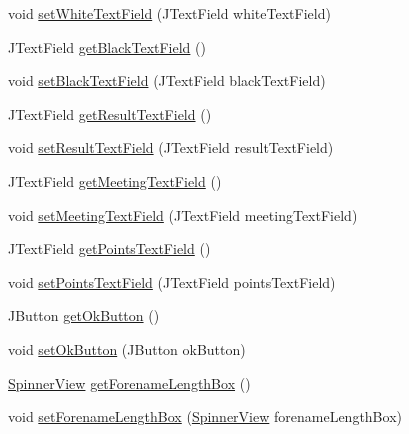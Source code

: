 \begin{DoxyCompactItemize}
\item 
void \hyperlink{classde_1_1turnierverwaltung_1_1view_1_1_settings_view_afed5802f8efe36f394f4f3c52293af0a}{set\+White\+Text\+Field} (J\+Text\+Field white\+Text\+Field)
\item 
J\+Text\+Field \hyperlink{classde_1_1turnierverwaltung_1_1view_1_1_settings_view_aff2ad10392883ad57f2d52b2e9c9bcf4}{get\+Black\+Text\+Field} ()
\item 
void \hyperlink{classde_1_1turnierverwaltung_1_1view_1_1_settings_view_ac0c84d91993e8a69f2d881677b52ac92}{set\+Black\+Text\+Field} (J\+Text\+Field black\+Text\+Field)
\item 
J\+Text\+Field \hyperlink{classde_1_1turnierverwaltung_1_1view_1_1_settings_view_a7e8f7264776e0f74a62793919a513cfe}{get\+Result\+Text\+Field} ()
\item 
void \hyperlink{classde_1_1turnierverwaltung_1_1view_1_1_settings_view_abf9376b0c56ca9e6a0b1d2142349c66c}{set\+Result\+Text\+Field} (J\+Text\+Field result\+Text\+Field)
\item 
J\+Text\+Field \hyperlink{classde_1_1turnierverwaltung_1_1view_1_1_settings_view_a02e52b023a745f1feea93f39beca2133}{get\+Meeting\+Text\+Field} ()
\item 
void \hyperlink{classde_1_1turnierverwaltung_1_1view_1_1_settings_view_aa22e7e8cab7b73fbb075499e66836343}{set\+Meeting\+Text\+Field} (J\+Text\+Field meeting\+Text\+Field)
\item 
J\+Text\+Field \hyperlink{classde_1_1turnierverwaltung_1_1view_1_1_settings_view_aaf40591ea73b3f9332d74bcfd8b5f07c}{get\+Points\+Text\+Field} ()
\item 
void \hyperlink{classde_1_1turnierverwaltung_1_1view_1_1_settings_view_a77b2ce1457e4abfcb1b94c8bdf1af6ac}{set\+Points\+Text\+Field} (J\+Text\+Field points\+Text\+Field)
\item 
J\+Button \hyperlink{classde_1_1turnierverwaltung_1_1view_1_1_settings_view_a31a8322fd1c5849f045b62e918b9cf91}{get\+Ok\+Button} ()
\item 
void \hyperlink{classde_1_1turnierverwaltung_1_1view_1_1_settings_view_ae8ad71b7ecc4f519af4a82cca0772e57}{set\+Ok\+Button} (J\+Button ok\+Button)
\item 
\hyperlink{classde_1_1turnierverwaltung_1_1view_1_1_spinner_view}{Spinner\+View} \hyperlink{classde_1_1turnierverwaltung_1_1view_1_1_settings_view_ad1f6c176b592b9e3fc676a5581ae1dd2}{get\+Forename\+Length\+Box} ()
\item 
void \hyperlink{classde_1_1turnierverwaltung_1_1view_1_1_settings_view_a0d8ba59c58e53ba61b8fe77ab5f18e65}{set\+Forename\+Length\+Box} (\hyperlink{classde_1_1turnierverwaltung_1_1view_1_1_spinner_view}{Spinner\+View} forename\+Length\+Box)

\end{DoxyCompactItemize}
